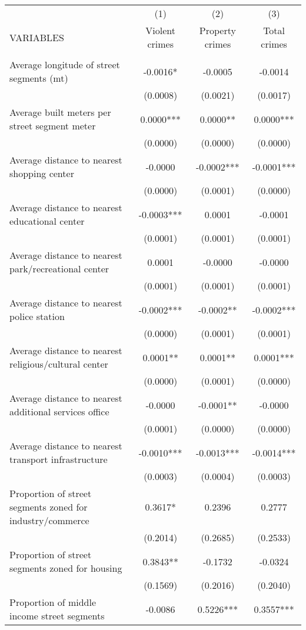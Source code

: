 \documentclass[]{article}
\begin{document}
\begin{tabular}{lccc} \hline
 & (1) & (2) & (3) \\
VARIABLES & Violent crimes & Property crimes & Total crimes \\ \hline
 &  &  &  \\
Average longitude of street segments (mt) & -0.0016* & -0.0005 & -0.0014 \\
 & (0.0008) & (0.0021) & (0.0017) \\
Average built meters per street segment meter & 0.0000*** & 0.0000** & 0.0000*** \\
 & (0.0000) & (0.0000) & (0.0000) \\
Average distance to nearest shopping center & -0.0000 & -0.0002*** & -0.0001*** \\
 & (0.0000) & (0.0001) & (0.0000) \\
Average distance to nearest educational center & -0.0003*** & 0.0001 & -0.0001 \\
 & (0.0001) & (0.0001) & (0.0001) \\
Average distance to nearest park/recreational center & 0.0001 & -0.0000 & -0.0000 \\
 & (0.0001) & (0.0001) & (0.0001) \\
Average distance to nearest police station & -0.0002*** & -0.0002** & -0.0002*** \\
 & (0.0000) & (0.0001) & (0.0001) \\
Average distance to nearest religious/cultural center & 0.0001** & 0.0001** & 0.0001*** \\
 & (0.0000) & (0.0001) & (0.0000) \\
Average distance to nearest additional services office & -0.0000 & -0.0001** & -0.0000 \\
 & (0.0001) & (0.0000) & (0.0000) \\
Average distance to nearest transport infrastructure & -0.0010*** & -0.0013*** & -0.0014*** \\
 & (0.0003) & (0.0004) & (0.0003) \\
Proportion of street segments zoned for industry/commerce & 0.3617* & 0.2396 & 0.2777 \\
 & (0.2014) & (0.2685) & (0.2533) \\
Proportion of street segments zoned for housing & 0.3843** & -0.1732 & -0.0324 \\
 & (0.1569) & (0.2016) & (0.2040) \\
Proportion of middle income street segments & -0.0086 & 0.5226*** & 0.3557*** \\

\end{tabular}
\end{document}
